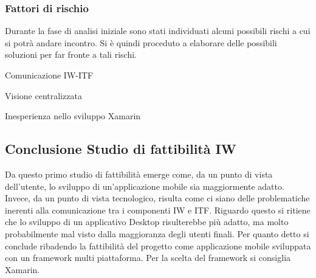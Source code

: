 \subsubsection{Fattori di rischio}
Durante la fase di analisi iniziale sono stati individuati alcuni possibili rischi a cui si potrà andare incontro.
Si è quindi proceduto a elaborare delle possibili soluzioni per far fronte a tali rischi.\\


\begin{risk}{Comunicazione IW-ITF}
    \label{risk:comunication-iw-itf} 
\end{risk}
\begin{risk}{Visione centralizzata}
    \label{risk:centralization-vision-from-user} 
\end{risk}
\begin{risk}{Inesperienza nello sviluppo Xamarin}
    \label{risk:centralization-vision-from-user} 
\end{risk}
\subsection{Conclusione Studio di fattibilità IW}
Da questo primo studio di fattibilità emerge come, da un punto di vista dell’utente, lo sviluppo di un’applicazione mobile sia maggiormente adatto. Invece, da un punto di vista tecnologico, risulta come ci siano delle problematiche inerenti alla comunicazione tra i componenti IW e ITF. Riguardo questo si ritiene che lo sviluppo di un applicativo Desktop risulterebbe più adatto, ma molto probabilmente mal visto dalla maggioranza degli utenti finali. 
Per quanto detto si conclude ribadendo la fattibilità del progetto come applicazione mobile sviluppata con un framework multi piattaforma. Per la scelta del framework si consiglia Xamarin.
